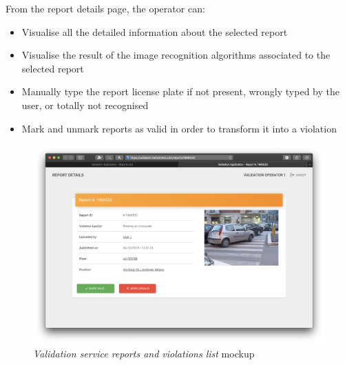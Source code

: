 From the report details page, the operator can:
\begin{itemize}
	\item Visualise all the detailed information about the selected report
	\item Visualise the result of the image recognition algorithms associated to the selected report
	\item Manually type the report license plate if not present, wrongly typed by the user, or totally not recognised
	\item Mark and unmark reports as valid in order to transform it into a violation\newline\newline
\end{itemize}

\begin{figure}[ht!]
	\hspace*{-1cm}
	\centering
	\includegraphics[scale=0.3]{mockups/validationApp2.png}
	\caption{
		\label{fig:cc2} 
		\emph{Validation service reports and violations list} mockup
	}
\end{figure}